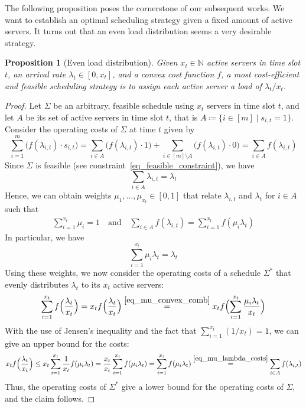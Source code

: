 \documentclass[hidelinks]{article}
\theoremstyle{plain}
\newtheorem{prop}[thm]{Proposition}
\theoremstyle{definition}
\theoremstyle{rem}
\begin{document}
The following proposition poses the cornerstone of our subsequent works. We want to establish an optimal scheduling strategy given a fixed amount of active servers. It turns out that an even load distribution seems a very desirable strategy.
\begin{prop}[Even load distribution]\label{prop_even_load_distribution}
Given $x_t\in\mathbb{N}$ active servers in time slot $t$, an arrival rate $\lambda_t\in[0,x_t]$, and a convex cost function $f$, a most cost-efficient and feasible scheduling strategy is to assign each active server a load of $\lambda_t/x_t$.
\end{prop}
\begin{proof}
Let $\Sigma$ be an arbitrary, feasible schedule using $x_t$ servers in time slot $t$, and let $A$ be its set of active servers in time slot $t$, that is $A\coloneqq\{i\in[m]\mid s_{i,t}=1\}$.
Consider the operating costs of $\Sigma$ at time $t$ given by
\begin{equation*}
	\sum\limits_{i=1}^{m}\bigl(f(\lambda_{i,t})\cdot s_{i,t}\bigr)=\sum\limits_{i\in A}\bigl(f(\lambda_{i,t})\cdot1\bigr)+\sum\limits_{i\in [m]\setminus A}\bigl(f(\lambda_{i,t})\cdot0\bigr)=\sum\limits_{i\in A}f(\lambda_{i,t})
\end{equation*}
Since $\Sigma$ is feasible (see constraint~\eqref{eq_feasible_constraint}), we have 
\begin{equation*}
	\sum\limits_{i\in A}\lambda_{i,t}=\lambda_t
\end{equation*}
Hence, we can obtain weights $\mu_1,\ldots,\mu_{x_t}\in[0,1]$ that relate $\lambda_{i,t}$ and $\lambda_t$ for $i\in A$ such that
\begin{align}
	\sum\limits_{i=1}^{x_t}\mu_i=1\quad\text{and}\quad \sum\limits_{i\in A}f(\lambda_{i,t})=\sum\limits_{i=1}^{x_t}f(\mu_i\lambda_t)\label{eq_mu_lambda_costs}
\end{align}
In particular, we have 
\begin{equation}
	\sum_{i=1}^{x_t}\mu_i\lambda_t=\lambda_t\label{eq_mu_convex_comb}
\end{equation}
Using these weights, we now consider the operating costs of a schedule $\Sigma^*$ that evenly distributes $\lambda_t$ to its $x_t$ active servers:
\begin{align*}
	\sum\limits_{i=1}^{x_t}f\Bigl(\frac{\lambda_t}{x_t}\Bigr)=x_tf\Bigl(\frac{\lambda_t}{x_t}\Bigr)\stackrel{\eqref{eq_mu_convex_comb}}{=}x_tf\Bigl(\sum\limits_{i=1}^{x_t}{\frac{\mu_i\lambda_t}{x_t}}\Bigr)
\end{align*}
With the use of Jensen's inequality and the fact that $\sum_{i=1}^{x_t}(1/x_t)=1$, we can give an upper bound for the costs:
\begin{align*}
	x_tf\Bigl(\frac{\lambda_t}{x_t}\Bigr)\le x_t\sum\limits_{i=1}^{x_t}\frac{1}{x_t}f(\mu_i\lambda_t)=\frac{x_t}{x_t}\sum\limits_{i=1}^{x_t}f(\mu_i\lambda_t)=\sum\limits_{i=1}^{x_t}f(\mu_i\lambda_t)\stackrel{\eqref{eq_mu_lambda_costs}}{=}\sum\limits_{i\in A}f(\lambda_{i,t})
\end{align*}
Thus, the operating costs of $\Sigma^*$ give a lower bound for the operating costs of $\Sigma$, and the claim follows.
\end{proof}
\end{document}
